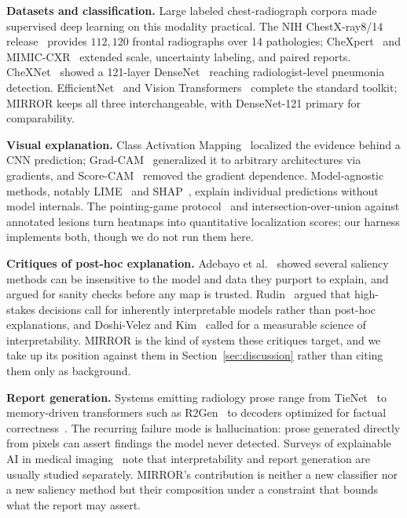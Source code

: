 \documentclass[conference]{IEEEtran}
\newcommand{\rih}[1]{\textbf{#1}\enspace\ignorespaces}
\begin{document}
\rih{Datasets and classification.} Large labeled chest-radiograph corpora made
supervised deep learning on this modality practical. The NIH ChestX-ray8/14
release~\cite{wang2017chestxray} provides $112{,}120$ frontal radiographs over 14
pathologies; CheXpert~\cite{irvin2019chexpert} and MIMIC-CXR~\cite{johnson2019mimiccxr}
extended scale, uncertainty labeling, and paired reports. CheXNet~\cite{rajpurkar2017chexnet}
showed a 121-layer DenseNet~\cite{huang2017densenet} reaching radiologist-level
pneumonia detection. EfficientNet~\cite{tan2019efficientnet} and Vision
Transformers~\cite{dosovitskiy2021vit} complete the standard toolkit; MIRROR keeps
all three interchangeable, with DenseNet-121 primary for comparability.

\rih{Visual explanation.} Class Activation Mapping~\cite{zhou2016cam} localized the
evidence behind a CNN prediction; Grad-CAM~\cite{selvaraju2017gradcam} generalized
it to arbitrary architectures via gradients, and Score-CAM~\cite{wang2020scorecam}
removed the gradient dependence. Model-agnostic methods, notably
LIME~\cite{ribeiro2016lime} and SHAP~\cite{lundberg2017shap}, explain individual
predictions without model internals. The pointing-game protocol~\cite{zhang2016pointing}
and intersection-over-union against annotated lesions turn heatmaps into
quantitative localization scores; our harness implements both, though we do not run
them here.

\rih{Critiques of post-hoc explanation.} Adebayo et al.~\cite{adebayo2018sanity}
showed several saliency methods can be insensitive to the model and data they
purport to explain, and argued for sanity checks before any map is trusted.
Rudin~\cite{rudin2019stop} argued that high-stakes decisions call for inherently
interpretable models rather than post-hoc explanations, and Doshi-Velez and
Kim~\cite{doshivelez2017rigorous} called for a measurable science of
interpretability. MIRROR is the kind of system these critiques target, and we take
up its position against them in Section~\ref{sec:discussion} rather than citing
them only as background.

\rih{Report generation.} Systems emitting radiology prose range from
TieNet~\cite{wang2018tienet} to memory-driven transformers such as
R2Gen~\cite{chen2020r2gen} to decoders optimized for factual
correctness~\cite{liu2019clinically}. The recurring failure mode is hallucination:
prose generated directly from pixels can assert findings the model never detected.
Surveys of explainable AI in medical imaging~\cite{tjoa2021survey} note that
interpretability and report generation are usually studied separately. MIRROR's
contribution is neither a new classifier nor a new saliency method but their
composition under a constraint that bounds what the report may assert.
\end{document}
